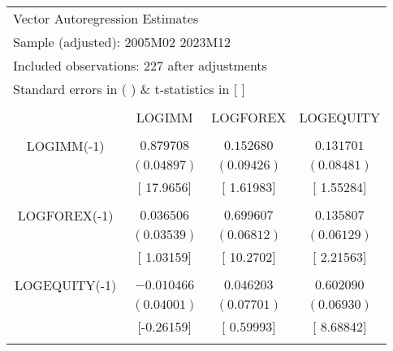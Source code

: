 \begin{tabular}{lrrr}
\multicolumn{2}{l}{Vector Autoregression Estimates}&\multicolumn{1}{c}{}&\multicolumn{1}{c}{}\\
\multicolumn{3}{l}{Sample (adjusted): 2005M02 2023M12}&\multicolumn{1}{c}{}\\
\multicolumn{3}{l}{Included observations: 227 after adjustments}&\multicolumn{1}{c}{}\\
\multicolumn{3}{l}{Standard errors in ( ) \& t-statistics in [ ]}&\multicolumn{1}{c}{}\\
[4.5pt] \hline \\ [-4.5pt]
\multicolumn{1}{c}{}&\multicolumn{1}{c}{LOGIMM}&\multicolumn{1}{c}{LOGFOREX}&\multicolumn{1}{c}{LOGEQUITY}\\
[4.5pt] \hline \\ [-4.5pt]
\multicolumn{1}{c}{LOGIMM(-1)}&\multicolumn{1}{c}{$0.879708$}&\multicolumn{1}{c}{$0.152680$}&\multicolumn{1}{c}{$0.131701$}\\
\multicolumn{1}{c}{}&\multicolumn{1}{c}{$(0.04897)$}&\multicolumn{1}{c}{$(0.09426)$}&\multicolumn{1}{c}{$(0.08481)$}\\
\multicolumn{1}{c}{}&\multicolumn{1}{c}{[ 17.9656]}&\multicolumn{1}{c}{[ 1.61983]}&\multicolumn{1}{c}{[ 1.55284]}\\
\multicolumn{1}{c}{}&\multicolumn{1}{c}{}&\multicolumn{1}{c}{}&\multicolumn{1}{c}{}\\
\multicolumn{1}{c}{LOGFOREX(-1)}&\multicolumn{1}{c}{$0.036506$}&\multicolumn{1}{c}{$0.699607$}&\multicolumn{1}{c}{$0.135807$}\\
\multicolumn{1}{c}{}&\multicolumn{1}{c}{$(0.03539)$}&\multicolumn{1}{c}{$(0.06812)$}&\multicolumn{1}{c}{$(0.06129)$}\\
\multicolumn{1}{c}{}&\multicolumn{1}{c}{[ 1.03159]}&\multicolumn{1}{c}{[ 10.2702]}&\multicolumn{1}{c}{[ 2.21563]}\\
\multicolumn{1}{c}{}&\multicolumn{1}{c}{}&\multicolumn{1}{c}{}&\multicolumn{1}{c}{}\\
\multicolumn{1}{c}{LOGEQUITY(-1)}&\multicolumn{1}{c}{$-0.010466$}&\multicolumn{1}{c}{$0.046203$}&\multicolumn{1}{c}{$0.602090$}\\
\multicolumn{1}{c}{}&\multicolumn{1}{c}{$(0.04001)$}&\multicolumn{1}{c}{$(0.07701)$}&\multicolumn{1}{c}{$(0.06930)$}\\
\multicolumn{1}{c}{}&\multicolumn{1}{c}{[-0.26159]}&\multicolumn{1}{c}{[ 0.59993]}&\multicolumn{1}{c}{[ 8.68842]}\\
\multicolumn{1}{c}{}&\multicolumn{1}{c}{}&\multicolumn{1}{c}{}&\multicolumn{1}{c}{}\\

\end{tabular}
